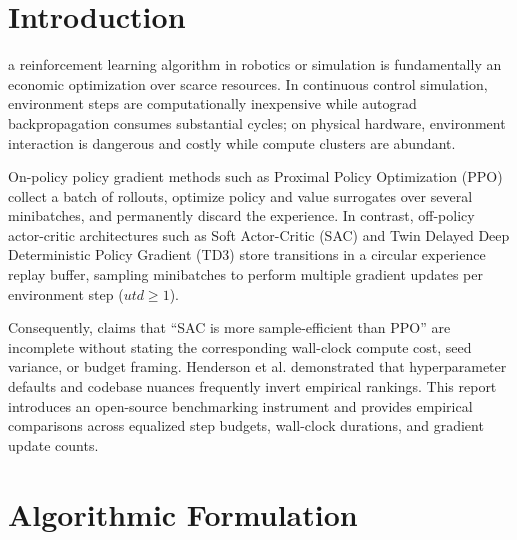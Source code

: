 \documentclass[10pt,journal,compsoc]{IEEEtran}
\begin{document}
\maketitle
\IEEEdisplaynontitleabstractindextext
\IEEEpeerreviewmaketitle

\section{Introduction}
 a reinforcement learning algorithm in robotics or simulation is fundamentally an economic optimization over scarce resources. In continuous control simulation, environment steps are computationally inexpensive while autograd backpropagation consumes substantial cycles; on physical hardware, environment interaction is dangerous and costly while compute clusters are abundant.

On-policy policy gradient methods such as Proximal Policy Optimization (PPO) \cite{schulman2017ppo} collect a batch of rollouts, optimize policy and value surrogates over several minibatches, and permanently discard the experience. In contrast, off-policy actor-critic architectures such as Soft Actor-Critic (SAC) \cite{haarnoja2018sac} and Twin Delayed Deep Deterministic Policy Gradient (TD3) \cite{fujimoto2018td3} store transitions in a circular experience replay buffer, sampling minibatches to perform multiple gradient updates per environment step ($utd \ge 1$).

Consequently, claims that ``SAC is more sample-efficient than PPO'' are incomplete without stating the corresponding wall-clock compute cost, seed variance, or budget framing. Henderson et al. \cite{henderson2018matters} demonstrated that hyperparameter defaults and codebase nuances frequently invert empirical rankings. This report introduces an open-source benchmarking instrument and provides empirical comparisons across equalized step budgets, wall-clock durations, and gradient update counts.

\section{Algorithmic Formulation}
\end{document}
